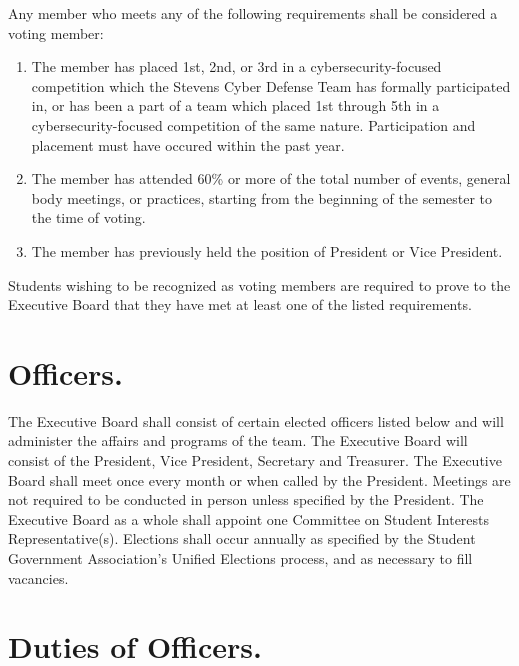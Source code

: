 \documentclass[12pt]{constitution}
\begin{document}

Any member who meets any of the following requirements shall be considered a
voting member:

\begin{enumerate}
    \item The member has placed 1st, 2nd, or 3rd in a cybersecurity-focused
    competition which the Stevens Cyber Defense Team has formally participated
    in, or has been a part of a team which placed 1st through 5th in a
    cybersecurity-focused competition of the same nature. Participation and
    placement must have occured within the past year.
    \item The member has attended 60\% or more of the total number of events,
    general body meetings, or practices, starting from the beginning of the
    semester to the time of voting.
    \item The member has previously held the position of President or Vice
    President.
\end{enumerate}

Students wishing to be recognized as voting members are required to prove to the
Executive Board that they have met at least one of the listed requirements.

\label{art:EXECUTIVE-BOARD}

\section{Officers.}\label{art:OFFICERS}

The Executive Board shall consist of certain elected officers listed below and
will administer the affairs and programs of the team. The Executive Board will
consist of the President, Vice President, Secretary and Treasurer. The Executive
Board shall meet once every month or when called by the President. Meetings are
not required to be conducted in person unless specified by the President. The
Executive Board as a whole shall appoint one Committee on Student Interests
Representative(s). Elections shall occur annually as specified by the Student
Government Association’s Unified Elections process, and as necessary to fill
vacancies.

\section{Duties of Officers.}\label{sec:DUTIES}
\end{document}
